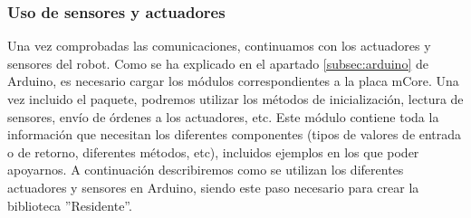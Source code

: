 \subsubsection{Uso de sensores y actuadores}
Una vez comprobadas las comunicaciones, continuamos con los actuadores y sensores del robot. Como se ha explicado en el apartado \ref{subsec:arduino} de Arduino, es necesario cargar los módulos correspondientes a la placa mCore. Una vez incluido el paquete, podremos utilizar los métodos de inicialización, lectura de sensores, envío de órdenes a los actuadores, etc. Este módulo contiene toda la información que necesitan los diferentes componentes (tipos de valores de entrada o de retorno, diferentes métodos, etc), incluidos ejemplos en los que poder apoyarnos. A continuación describiremos como se utilizan los diferentes actuadores y sensores en Arduino, siendo este paso necesario para crear la biblioteca ''Residente''.\\
